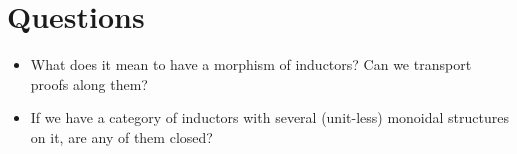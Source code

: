 \documentclass{article}
\begin{document}
\section{Questions}

\begin{itemize}
\item What does it mean to have a morphism of inductors? Can we
  transport proofs along them?
\item If we have a category of inductors with several (unit-less)
  monoidal structures on it, are any of them closed?
\end{itemize}
\end{document}
